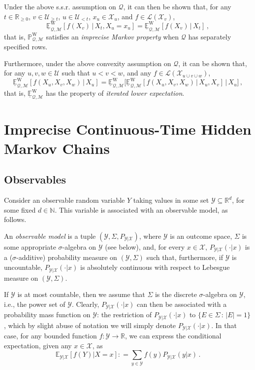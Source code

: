 \documentclass[twoside,11pt]{article}
\newcommand{\nats}{\mathbb{N}}
\newcommand{\reals}{\mathbb{R}}
\newcommand{\realsnonneg}{\reals_{\geq 0}}
\newcommand{\states}{\mathcal{X}}
\newcommand{\observs}{\mathcal{Y}}
\newcommand{\processes}{\mathbb{P}}
\newcommand{\wprocesses}{\processes^{\mathrm{W}}}
\newcommand{\lexp}{\underline{\mathbb{E}}_{\rateset,\mathcal{M}}^\mathrm{W}}
\newcommand{\gambles}{\mathcal{L}}
\newcommand{\rateset}{\mathcal{Q}}
\newcommand{\coloneqq}{:\!=}
\begin{document}
Under the above s.s.r. assumption on $\rateset$, it can then be shown that, for any $t\in\realsnonneg$, $v\in\mathcal{U}_{\geq t}$, $u\in\mathcal{U}_{<t}$, $x_u\in\states_u$, and $f\in\gambles(\states_v)$,
\begin{equation*}
\lexp[f(X_v)\,\vert\,X_t,X_u=x_u] = \lexp[f(X_v)\,\vert\,X_t]\,,
\end{equation*}
that is, $\wprocesses_{\rateset,\mathcal{M}}$ satisfies an \emph{imprecise Markov property} when $\rateset$ has separately specified rows.

Furthermore, under the above convexity assumption on $\rateset$, it can be shown that, for any $u,v,w\in\mathcal{U}$ such that $u<v<w$, and any $f\in\gambles(\states_{u\cup v\cup w})$,
\begin{equation*}
\lexp[f(X_u,X_v,X_w)\,\vert\,X_u] = \lexp\bigl[\lexp[f(X_u,X_v,X_w)\,\vert\,X_u,X_v]\,\big\vert\,X_u\bigr]\,,
\end{equation*}
that is, $\lexp$ has the property of \emph{iterated lower expectation}.

\section{Imprecise Continuous-Time Hidden Markov Chains}\label{sec:icthmc}

\subsection{Observables}

Consider an observable random variable $Y$ taking values in some set $\observs\subseteq\reals^d$, for some fixed $d\in\nats$. This variable is associated with an observable model, as follows.

\begin{definition}
An \emph{observable model} is a tuple $(\observs,\Sigma,P_{\observs\vert \states})$, where $\observs$ is an outcome space, $\Sigma$ is some appropriate $\sigma$-algebra on $\observs$ (see below), and, for every $x\in\states$, $P_{\observs\vert\states}(\cdot\vert x)$ is a ($\sigma$-additive) probability measure on $(\observs,\Sigma)$ such that, furthermore, if $\observs$ is uncountable, $P_{\observs\vert\states}(\cdot\vert x)$ is absolutely continuous with respect to Lebesgue measure on $(\observs,\Sigma)$.
\end{definition}
If $\observs$ is at most countable, then we assume that $\Sigma$ is the discrete $\sigma$-algebra on $\observs$, i.e., the power set of $\observs$. Clearly, $P_{\observs\vert\states}(\cdot\vert x)$ can then be associated with a probability mass function on $\observs$: the restriction of $P_{\observs\vert\states}(\cdot\vert x)$ to $\{E\in\Sigma\,:\,\lvert E\rvert = 1\}$, which by slight abuse of notation we will simply denote $P_{\observs\vert\states}(\cdot\vert x)$. In that case, for any bounded function $f:\observs\to\reals$, we can express the conditional expectation, given any $x\in\states$, as
\begin{equation*}
\mathbb{E}_{\observs\vert\states}[f(Y)\vert X=x] \coloneqq \sum_{y\in\observs} f(y) P_{\observs\vert\states}(y\vert x)\,.
\end{equation*}
\end{document}
